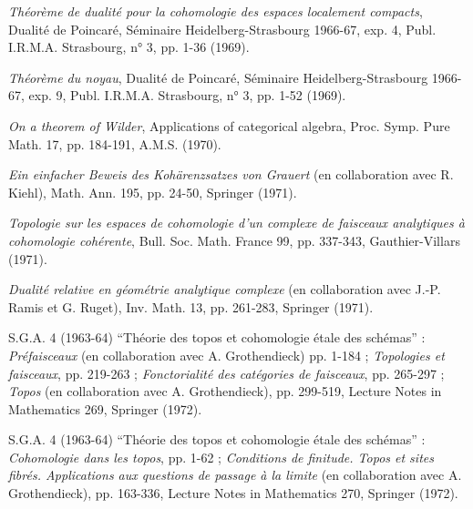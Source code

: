 \begin{description}
\item[{[12]}] \emph{Théorème de dualité pour la cohomologie des espaces
localement compacts}, Dualité de Poincaré, Séminaire Heidelberg-Strasbourg
1966-67, exp. 4, Publ. I.R.M.A. Strasbourg, n° 3, pp. 1-36 (1969).

\item[{[13]}] \emph{Théorème du noyau}, Dualité de Poincaré, Séminaire
Heidelberg-Strasbourg 1966-67, exp. 9, Publ. I.R.M.A. Strasbourg, n° 3,
pp. 1-52 (1969).

\item[{[14]}] \emph{On a theorem of Wilder}, Applications of categorical
algebra, Proc. Symp. Pure Math. 17, pp. 184-191, A.M.S. (1970).

\item[{[15]}] \emph{Ein einfacher Beweis des Kohärenzsatzes von Grauert}
(en collaboration avec R. Kiehl), Math. Ann. 195, pp. 24-50,
Springer (1971).

\item[{[16]}] \emph{Topologie sur les espaces de cohomologie d'un complexe de
faisceaux analytiques à cohomologie cohérente}, Bull. Soc. Math. France 99,
pp. 337-343, Gauthier-Villars (1971).

\item[{[17]}] \emph{Dualité relative en géométrie analytique complexe}
(en collaboration avec J.-P. Ramis et G. Ruget), Inv. Math. 13,
pp. 261-283, Springer (1971).

\item[{[18]}] S.G.A. 4 (1963-64) “Théorie des topos et cohomologie étale des
schémas” : \emph{Préfaisceaux} (en collaboration avec A. Grothendieck)
pp. 1-184 ; \emph{Topologies et faisceaux}, pp. 219-263 ;
\emph{Fonctorialité des catégories de faisceaux}, pp. 265-297 ;
\emph{Topos} (en collaboration avec A. Grothendieck), pp. 299-519,
Lecture Notes in Mathematics 269, Springer (1972).

\item[{[19]}] S.G.A. 4 (1963-64) “Théorie des topos et cohomologie étale des
schémas” : \emph{Cohomologie dans les topos}, pp. 1-62 ;
\emph{Conditions de finitude. Topos et sites fibrés. Applications aux questions
de passage à la limite} (en collaboration avec A. Grothendieck), pp. 163-336,
Lecture Notes in Mathematics 270, Springer (1972).


\end{description}
